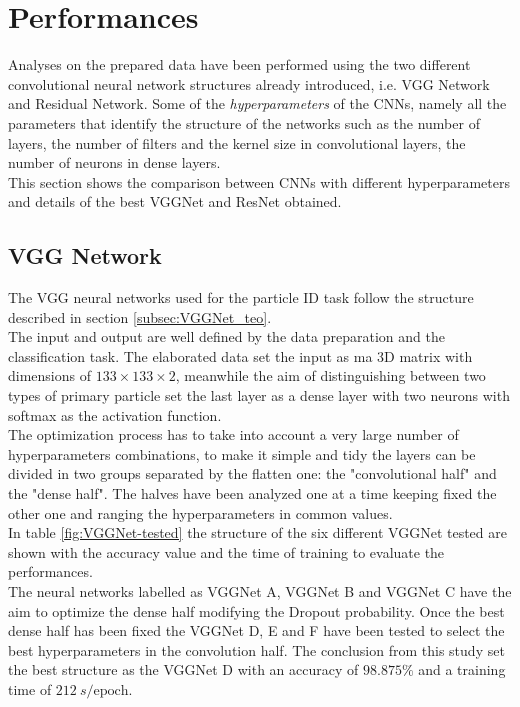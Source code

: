 \section{Performances}\label{sec:NN_perf}
Analyses on the prepared data have been performed using the two different convolutional neural network structures already introduced, i.e. VGG Network and Residual Network. Some of the \textit{hyperparameters} of the CNNs, namely all the parameters that identify the structure of the networks such as the number of layers, the number of filters and the kernel size in convolutional layers, the number of neurons in dense layers.\\
This section shows the comparison between CNNs with different hyperparameters and details of the best VGGNet and ResNet obtained.

\subsection{VGG Network}
The VGG neural networks used for the particle ID task follow the structure described in section \ref{subsec:VGGNet_teo}.\\
The input and output are well defined by the data preparation and the classification task. The elaborated data set the input as ma 3D matrix with dimensions of $133 \times 133 \times 2$, meanwhile the aim of distinguishing between two types of primary particle set the last layer as a dense layer with two neurons with softmax as the activation function.\\
The optimization process has to take into account a very large number of hyperparameters combinations, to make it simple and tidy the layers can be divided in two groups separated by the flatten one: the "convolutional half" and the "dense half". The halves have been analyzed one at a time keeping fixed the other one and ranging the hyperparameters in common values.\\
In table \ref{fig:VGGNet-tested} the structure of the six different VGGNet tested are shown with the accuracy value and the time of training to evaluate the performances.\\
The neural networks labelled as VGGNet A, VGGNet B and VGGNet C have the aim to optimize the dense half modifying the Dropout probability. Once the best dense half has been fixed the VGGNet D, E and F have been tested to select the best hyperparameters in the convolution half. The conclusion from this study set the best structure as the VGGNet D with an accuracy of $98.875\%$ and a training time of $212\ s/\text{epoch}$.\\

